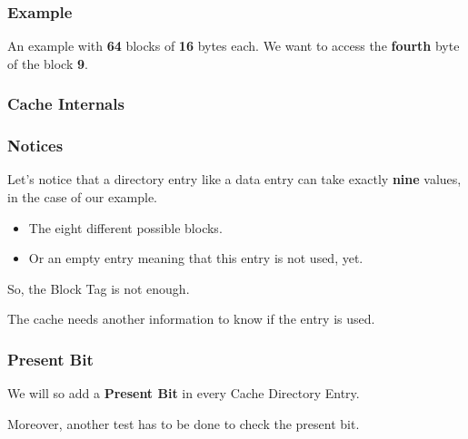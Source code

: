 
\begin{frame}
  \frametitle{Example}

  An example with \textbf{64} blocks of \textbf{16} bytes each. We want
  to access the \textbf{fourth} byte of the block \textbf{9}.

  \begin{center}
  \end{center}
\end{frame}


\begin{frame}
  \frametitle{Cache Internals}

  \begin{center}
  \end{center}
\end{frame}


\begin{frame}
  \frametitle{Notices}

  Let's notice that a directory entry like a data entry can take exactly
  \textbf{nine} values, in the case of our example.

  \begin{itemize}
    \item
      The eight different possible blocks.
    \item
      Or an empty entry meaning that this entry is not used, yet.
  \end{itemize}

  So, the Block Tag is not enough.

  \-

  The cache needs another information to know if the entry is used.
\end{frame}


\begin{frame}
  \frametitle{Present Bit}

  We will so add a \textbf{Present Bit} in every Cache Directory Entry.

  \-

  Moreover, another test has to be done to check the present bit.
\end{frame}


